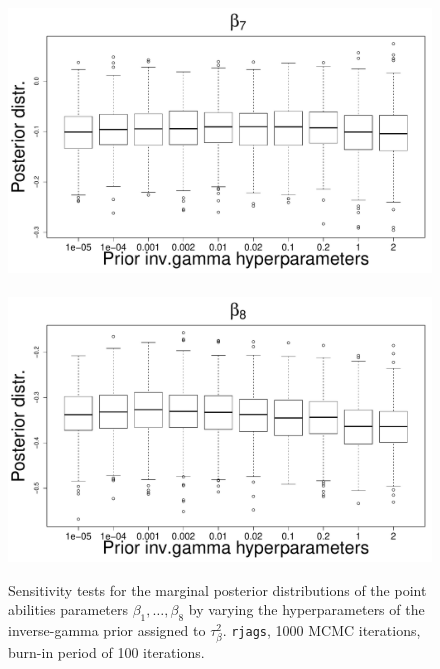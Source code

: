 \documentclass{statsoc}
\begin{document}
\begin{figure}
\includegraphics[scale=0.25]{Sensitivity/beta_7_sensitivity.pdf}~
\includegraphics[scale=0.25]{Sensitivity/beta_8_sensitivity.pdf}\\
\caption{Sensitivity tests for the marginal posterior distributions of the point abilities parameters $\beta_1, \ldots,\beta_8$ by varying the hyperparameters of the inverse-gamma prior assigned to $\tau^2_{\beta}$. {\tt rjags}, 1000 MCMC iterations, burn-in period of 100 iterations.}
\label{figS3}
\end{figure}
\end{document}

